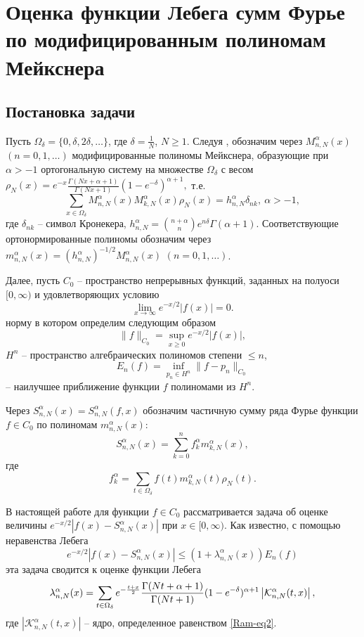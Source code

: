 

\chapter{Оценка функции Лебега сумм Фурье по модифицированным полиномам Мейкснера}
\section{Постановка задачи}

Пусть $\Omega_{\delta}=\{0, \delta, 2\delta, \ldots\}$, где $\delta=\frac{1}{N}$, $N\ge1$. Следуя \cite{RamSharMnog}, обозначим через $M_{n,N}^\alpha(x)$ $(n=0, 1, \dots)$ модифицированные полиномы Мейкснера, образующие при $\alpha>-1$ ортогональную систему на множестве $\Omega_{\delta}$ с весом
$\rho_N(x)=e^{-x}\frac{\Gamma(Nx+\alpha+1)}{\Gamma(Nx+1)}(1-e^{-\delta})^{\alpha+1},
$
т.е.
\begin{equation*}
\sum_{x\in\Omega_{\delta}} M_{n,N}^\alpha(x)M_{k,N}^\alpha(x)\rho_N(x)=h_{n,N}^\alpha\delta_{nk},\ \alpha>-1,
\end{equation*}
где $\delta_{nk}$ -- символ Кронекера, $h_{n,N}^\alpha={n+\alpha\choose n}e^{n\delta}\Gamma(\alpha+1).$
Соответствующие ортонормированные полиномы обозначим через $m_{n,N}^\alpha(x)=(h_{n,N}^\alpha)^{-1/2}M_{n,N}^\alpha(x)$ $(n=0, 1, \dots)$.

Далее, пусть $C_0$ -- пространство непрерывных функций, заданных на полуоси $[0,\infty)$ и удовлетворяющих условию
$$
\lim_{x\rightarrow\infty}e^{-x/2}|f(x)|=0.
$$
норму в котором определим следующим образом
$$
\|f\|_{C_0}=\sup_{x\geq0}e^{-x/2}|f(x)|,
$$
$H^n$ -- пространство алгебраических полиномов степени $\leq n$,
$$
E_n(f)=\inf_{p_n\in H^n}\|f-p_n\|_{C_0}
$$
-- наилучшее приближение функции $f$ полиномами из $H^n$.

Через $S_{n,N}^\alpha(x)=S^\alpha_{n,N}(f,x)$ обозначим частичную сумму ряда Фурье функции $f\in C_0$ по полиномам $m_{n,N}^\alpha(x)$:
$$
S_{n,N}^\alpha(x)=\sum_{k=0}^{n}f_k^\alpha m_{k,N}^\alpha(x),
$$
где
$$
f_k^{\alpha}=\sum_{t\in\Omega_\delta}f(t)m_{k,N}^\alpha(t)\rho_N(t).
$$

В настоящей работе для функции $f\in C_0$ рассматривается задача об оценке величины $e^{-x/2}|f(x)-S_{n,N}^\alpha(x)|$ при $x\in[0,\infty)$. Как известно, с помощью неравенства Лебега
$$
e^{-x/2}|f(x)-S_{n,N}^\alpha(x)|\leq (1+\lambda_{n,N}^\alpha(x))E_n(f)
$$
эта задача сводится к оценке функции Лебега
\begin{equation*}\label{RamLebFunc}
\lambda_{n,N}^{\alpha}(x)=
\sum_{t\in\Omega_{\delta}}e^{-{t+x\over 2}}{\Gamma(Nt+\alpha+1)\over\Gamma(Nt+1)}(1-e^{-\delta})^{\alpha+1}
\left|\mathcal{K}_{n,N}^\alpha(t,x)\right|,
\end{equation*}
где
$\left|\mathcal{K}_{n,N}^\alpha(t,x)\right|$ -- ядро, определенное равенством \eqref{Ram-eq2}.

